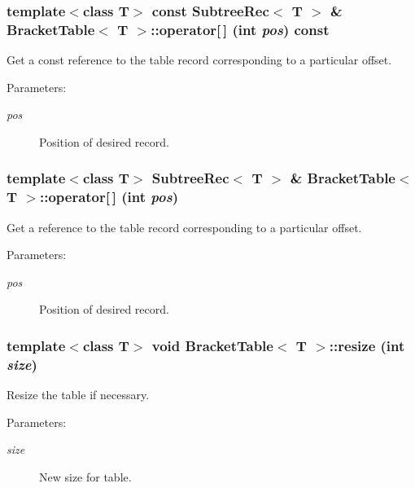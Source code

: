 \subsubsection{\setlength{\rightskip}{0pt plus 5cm}template$<$class T$>$ const {\bf Subtree\-Rec}$<$ T $>$ \& {\bf Bracket\-Table}$<$ T $>$::operator[$\,$] (int {\em pos}) const\hspace{0.3cm}{\tt  [inline]}}\label{classBracketTable_a9}


Get a const reference to the table record corresponding to a particular offset. 

\begin{Desc}
\item[Parameters:]
\begin{description}
\item[{\em pos}]Position of desired record. \end{description}
\end{Desc}
\subsubsection{\setlength{\rightskip}{0pt plus 5cm}template$<$class T$>$ {\bf Subtree\-Rec}$<$ T $>$ \& {\bf Bracket\-Table}$<$ T $>$::operator[$\,$] (int {\em pos})\hspace{0.3cm}{\tt  [inline]}}\label{classBracketTable_a8}


Get a reference to the table record corresponding to a particular offset. 

\begin{Desc}
\item[Parameters:]
\begin{description}
\item[{\em pos}]Position of desired record. \end{description}
\end{Desc}
\subsubsection{\setlength{\rightskip}{0pt plus 5cm}template$<$class T$>$ void {\bf Bracket\-Table}$<$ T $>$::resize (int {\em size})}\label{classBracketTable_a3}


Resize the table if necessary. 

\begin{Desc}
\item[Parameters:]
\begin{description}
\item[{\em size}]New size for table. \end{description}
\end{Desc}


